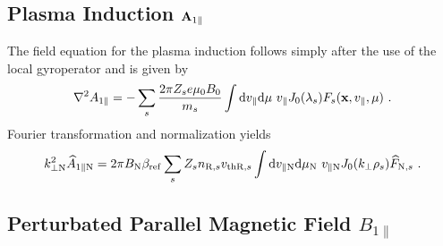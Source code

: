 \subsection*{Plasma Induction $\boldsymbol{\mathbf{A}}_{1\parallel}$}
\label{sub:fieldInductionLocal}

The field equation for the plasma induction follows simply after the use of the local gyroperator and is given by
\begin{gather}
	\nabla^2 A_{1\parallel} = - \sum_s \frac{2\pi Z_se \mu_0 B_0}{m_s}  \int \mathrm{d}v_\parallel\mathrm{d}\mu ~ v_\parallel J_0(\lambda_s) F_s(\boldsymbol{\mathbf{x}}, v_\parallel, \mu)~.
	\label{eq:fieldInductionLocal}
\end{gather}
Fourier transformation and normalization yields
\begin{gather}
	k_{\perp \mathrm{N}}^2 \widehat{A}_{1\parallel \mathrm{N}} = 2 \pi B_\mathrm{N} \beta_\mathrm{ref}\sum_s Z_s n_{\mathrm{R},s} v_{\mathrm{th}\mathrm{R},s} \int \mathrm{d}v_{\parallel \mathrm{N}}\mathrm{d}\mu_\mathrm{N} ~ v_{\parallel \mathrm{N}} J_0(k_\perp \rho_s) \widehat{F}_{\mathrm{N},s}~.
	\label{eq:fieldInductionLocalNorm}
\end{gather}

\subsection*{Perturbated Parallel Magnetic Field $B_{1\parallel}$}
\label{sub:fieldMagneticLocal}

